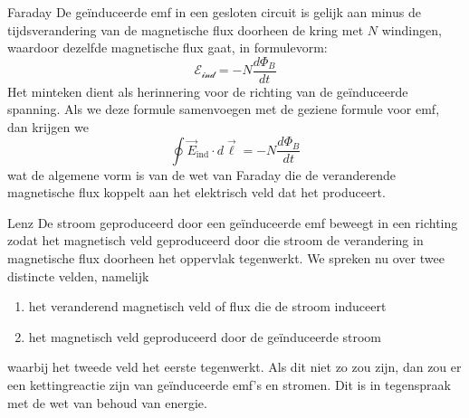 \begin{lem}[Faraday]{Faraday}
    De geïnduceerde emf in een gesloten circuit is gelijk aan minus de tijdsverandering van de magnetische flux doorheen de kring met $N$ windingen,
    waardoor dezelfde magnetische flux gaat, in formulevorm:
    \begin{equation*}
        \mathcal{E_{\text{ind}}} = -N\dfrac{d\Phi_{B}}{dt} 
    \end{equation*}
    Het minteken dient als herinnering voor de richting van de geïnduceerde spanning. Als we deze formule samenvoegen met de geziene formule voor emf, 
    dan krijgen we
    \begin{equation*}
        \oint \Vec{E}_{\text{ind}} \cdot d\Vec{\ell} = -N\dfrac{d\Phi_{B}}{dt} 
    \end{equation*}
    wat de algemene vorm is van de wet van Faraday die de veranderende magnetische flux koppelt aan het elektrisch veld dat het produceert.
\end{lem}

\begin{lem}[Lenz]{Lenz}
    De stroom geproduceerd door een geïnduceerde emf beweegt in een richting zodat het magnetisch veld geproduceerd 
    door die stroom de verandering in magnetische flux doorheen het oppervlak tegenwerkt. We spreken nu over twee distincte velden, namelijk
    \begin{enumerate}
        \item het veranderend magnetisch veld of flux die de stroom induceert
        \item het magnetisch veld geproduceerd door de geïnduceerde stroom
    \end{enumerate}
    waarbij het tweede veld het eerste tegenwerkt. Als dit niet zo zou zijn, dan zou er een kettingreactie zijn van
    geïnduceerde emf's en stromen. Dit is in tegenspraak met de wet van behoud van energie.
\end{lem}

